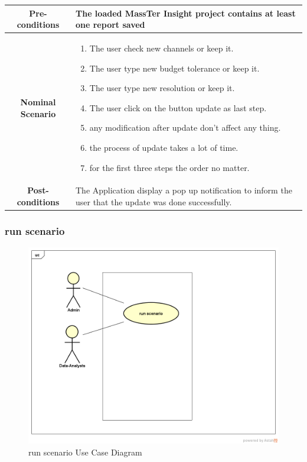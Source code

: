 \documentclass[12pt]{article}
\begin{document}
    \begin{table}
  	\centering
  	\begin{tabular}{|c|p{10cm}|}
  		\hline 	
  		\textbf{Pre-conditions } &The loaded MassTer Insight project contains at least one report saved \\ 
  		\hline                     
  		\textbf{Nominal Scenario } & \begin{enumerate}
  			\item The user check new channels or keep it.
  			\item The user type new budget tolerance or keep it.
  			\item The user type new resolution or keep it. 
  			\item The user click on the button update as last step.
  			\item any modification after update don't affect any thing.
  			\item the process of update takes a lot of time.
  			\item for the first three steps the order no matter.   
  		\end{enumerate} \\ 
  		\hline 
  		\textbf{Post-conditions} & The Application display a pop up notification to inform the user that the update was done successfully. \\
  		\hline 
  	\end{tabular}
  \end{table}
 \clearpage
 \newpage
	 \subsubsection{run scenario}
	 	\begin{figure}[h]
	 	\centering
	 	\includegraphics[width=1.0\textwidth]{runScenario.png}
	 	\caption{run scenario Use Case Diagram}
	 	
	 \end{figure}
 
\end{document}
